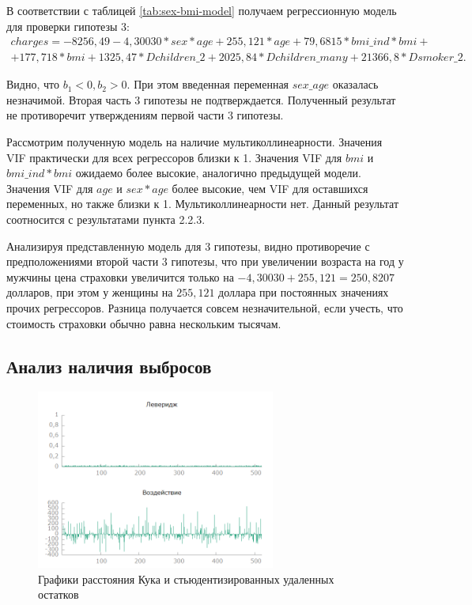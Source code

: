 \documentclass[a4paper,12pt]{article}
\begin{document}
В соответствии с таблицей \ref{tab:sex-bmi-model} получаем регрессионную модель для проверки гипотезы 3:
\begin{align*}
charges = -8256,49 - 4,30030 * sex * age + 255,121 * age + 79,6815 * bmi\_ind * bmi + \\ + 177,718 * bmi + 1325,47 * Dchildren\_2 + 2025,84 * Dchildren\_many + 21366,8 * Dsmoker\_2.
\end{align*}

Видно, что $b_1 < 0, b_2 > 0$. При этом введенная переменная $sex\_age$ оказалась незначимой. Вторая часть 3 гипотезы не подтверждается. Полученный результат не противоречит утверждениям первой части 3 гипотезы.

Рассмотрим полученную модель на наличие мультиколлинеарности. Значения VIF практически для всех регрессоров близки к 1. Значения  VIF для $bmi$ и $bmi\_ind * bmi$ ожидаемо более высокие, аналогично предыдущей модели. Значения VIF для $age$ и $sex * age$ более высокие, чем VIF для оставшихся переменных, но также близки к 1. Мультиколлинеарности нет. Данный результат соотносится с результатами пункта 2.2.3.

Анализируя представленную модель для 3 гипотезы, видно противоречие с предположениями второй части 3 гипотезы, что при увеличении возраста на год у мужчины цена страховки увеличится только на $-4,30030 + 255,121 = 250,8207$ долларов, при этом у женщины на $255,121$ доллара при постоянных значениях прочих регрессоров. Разница получается совсем незначительной, если учесть, что стоимость страховки обычно равна нескольким тысячам.

\subsection{Анализ наличия выбросов}
\begin{figure}[H]
	\includegraphics[width=0.7\textwidth]{../[graphics]/lever.png}
	\centering
	\caption{Графики расстояния Кука и стьюдентизированных удаленных остатков}
	\label{fig:lever}
\end{figure}
\end{document}
